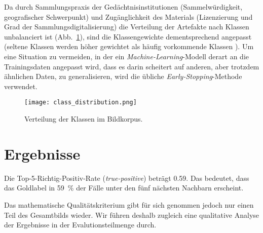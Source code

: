 Da durch Sammlungspraxis der Gedächtnisinstitutionen (Sammelwürdigkeit, geografischer Schwerpunkt) und Zugänglichkeit des Materials (Lizenzierung und Grad der Sammlungsdigitalisierung) die Verteilung der Artefakte nach Klassen unbalanciert ist (Abb.~\ref{fig:class_distribution}), sind die Klassengewichte dementsprechend angepasst (seltene Klassen werden höher gewichtet als häufig vorkommende Klassen \parencite[S.~27]{johnson_SurveyDeepLearningClassImbalance_2019}). Um eine Situation zu vermeiden, in der ein \emph{Machine-Learning}-Modell derart an die Trainingsdaten angepasst wird, dass es darin scheitert auf anderen, aber trotzdem ähnlichen Daten, zu generalisieren, wird die übliche \emph{Early-Stopping}-Methode verwendet. 

\begin{figure}
	\centering
	\texttt{[image: class\_distribution.png]}
	\caption{Verteilung der Klassen im Bildkorpus.}
	\label{fig:class_distribution}
\end{figure}

\section{Ergebnisse}
Die \mbox{Top-5-Richtig-Positiv-Rate} (\emph{true-positive}) beträgt \num{0.59}. Das bedeutet, dass das Goldlabel in \SI{59}{\percent} der Fälle unter den fünf nächsten Nachbarn erscheint.

Das mathematische Qualitätskriterium gibt für sich genommen jedoch nur einen Teil des Gesamtbilds wieder. Wir führen deshalb zugleich eine qualitative Analyse der Ergebnisse in der Evalutionsteilmenge durch.

